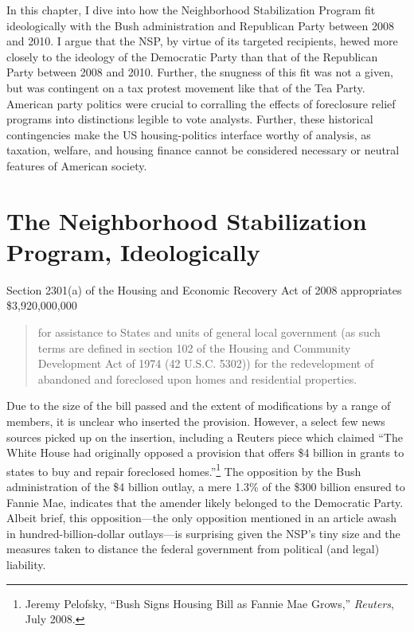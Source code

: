 \documentclass[12pt,oneside]{psthesis}
\begin{document}
In this chapter, I dive into how the Neighborhood Stabilization Program fit ideologically with the Bush administration and Republican Party between 2008 and 2010.
I argue that the NSP, by virtue of its targeted recipients, hewed more closely to the ideology of the Democratic Party than that of the Republican Party between 2008 and 2010.
Further, the snugness of this fit was not a given, but was contingent on a tax protest movement like that of the Tea Party.
American party politics were crucial to corralling the effects of foreclosure relief programs into distinctions legible to vote analysts.
Further, these historical contingencies make the US housing-politics interface worthy of analysis, as taxation, welfare, and housing finance cannot be considered necessary or neutral features of American society.

\hypertarget{the-neighborhood-stabilization-program-ideologically}{%
\section{The Neighborhood Stabilization Program, Ideologically}\label{the-neighborhood-stabilization-program-ideologically}}

Section 2301(a) of the Housing and Economic Recovery Act of 2008 appropriates \$3,920,000,000
\begin{quote}
for assistance to States and units of general local government (as such terms are defined in section 102 of the Housing and Community Development Act of 1974 (42 U.S.C. 5302)) for the redevelopment of abandoned and foreclosed upon homes and residential properties.
\end{quote}
Due to the size of the bill passed and the extent of modifications by a range of members, it is unclear who inserted the provision.
However, a select few news sources picked up on the insertion, including a Reuters piece which claimed ``The White House had originally opposed a provision that offers \$4 billion in grants to states to buy and repair foreclosed homes.''\footnote{Jeremy Pelofsky, ``Bush Signs Housing Bill as Fannie Mae Grows,'' \emph{Reuters}, July 2008.}
The opposition by the Bush administration of the \$4 billion outlay, a mere 1.3\% of the \$300 billion ensured to Fannie Mae, indicates that the amender likely belonged to the Democratic Party.
Albeit brief, this opposition---the only opposition mentioned in an article awash in hundred-billion-dollar outlays---is surprising given the NSP's tiny size and the measures taken to distance the federal government from political (and legal) liability.
\end{document}
